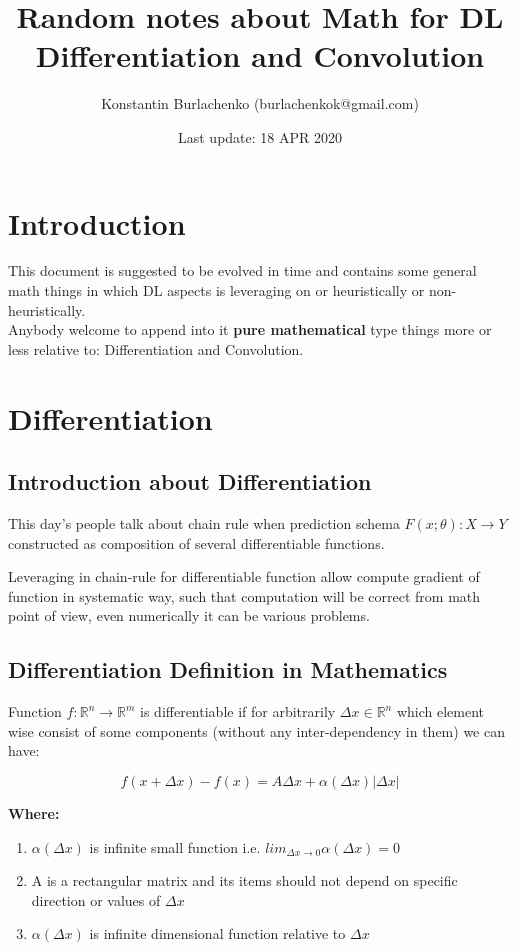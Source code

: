 \documentclass[12pt,a4paper]{article}
\title{\textbf{Random notes about Math for DL}\\Differentiation and Convolution}
\date{Last update: 18 APR 2020}
\author{Konstantin Burlachenko (burlachenkok@gmail.com)}
\theoremstyle{plain}
\begin{document}
	
\maketitle
\tableofcontents
\section{Introduction}
This document is suggested to be evolved in time and contains some general math things in which DL aspects is leveraging on or heuristically or non-heuristically.\\
Anybody welcome to append into it \textbf{pure mathematical} type things more or less relative to: Differentiation and Convolution.

\section{Differentiation}
\subsection{Introduction about Differentiation}
This day’s people talk about chain rule when prediction schema $F(x;\theta):X \to Y$ constructed as composition of several differentiable functions.


Leveraging in chain-rule for differentiable function allow compute gradient of function in systematic way, such that computation will be correct from math point of view, even numerically it can be various problems.

\subsection{Differentiation Definition in Mathematics}
Function $f:\mathbb{R}^{n} \rightarrow \mathbb{R}^{m}$ 
is differentiable if for arbitrarily $\varDelta x \in \mathbb{R}^{n}$ which element wise consist of some components (without any inter-dependency in them) we can have:

\begin{equation}
f(x+\varDelta x)-f(x) = A \varDelta x + \alpha(\varDelta x)|\varDelta x|
\end{equation} 

\textbf{Where:}
\begin{enumerate}
 \item $\alpha(\varDelta x)$ is infinite small function i.e. $lim_{\varDelta x \rightarrow 0} \alpha(\varDelta x) = 0$
 \item A is a rectangular matrix and its items should not depend on specific direction or values of $\varDelta x$
 \item $\alpha(\varDelta x)$ is infinite dimensional function relative to $\varDelta x$
\end{enumerate}
\end{document}
